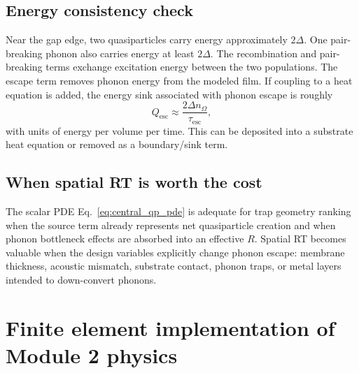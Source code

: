 \documentclass[11pt]{article}
\newcommand{\esc}{\mathrm{esc}}
\begin{document}
\subsection{Energy consistency check}
Near the gap edge, two quasiparticles carry energy approximately $2\Delta$. One pair-breaking phonon also carries energy at least $2\Delta$. The recombination and pair-breaking terms exchange excitation energy between the two populations. The escape term removes phonon energy from the modeled film. If coupling to a heat equation is added, the energy sink associated with phonon escape is roughly
\begin{equation}
Q_{\esc}\approx \frac{2\Delta n_{\Omega}}{\tau_{\esc}},
\end{equation}
with units of energy per volume per time. This can be deposited into a substrate heat equation or removed as a boundary/sink term.

\subsection{When spatial RT is worth the cost}
The scalar PDE Eq.~\eqref{eq:central_qp_pde} is adequate for trap geometry ranking when the source term already represents net quasiparticle creation and when phonon bottleneck effects are absorbed into an effective $R$. Spatial RT becomes valuable when the design variables explicitly change phonon escape: membrane thickness, acoustic mismatch, substrate contact, phonon traps, or metal layers intended to down-convert phonons.


\section{Finite element implementation of Module 2 physics}
\end{document}
